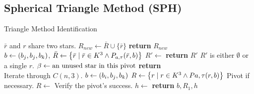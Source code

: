 \documentclass[conference]{IEEEtran}
\begin{document}
    \subsection{Spherical Triangle Method (SPH)}\label{subsec:sphericalTriangleMethod}
    \begin{algorithm}
        \caption{Triangle Method Identification} \label{algorithm:triangleIdentification}
        \begin{algorithmic}[1]
            \LineComment $\bar{r}$ and $r$ share two stars.
            \State $R_{new} \gets \bar{R} \cup \{\bar{r}\}$
            \EndIf
            \EndFor
            \State \textbf{return} $R_{new}$
            \EndFunction
            \\
            \State $b \gets (b_j, b_j, b_k)$, $\bar{R} \gets \left\{  \bar{r} \mid \bar{r} \in K^3
            \land P_{a, \tau}(\bar{r}, b)  \right\}$
            \State $R' \gets $ 
            \State \textbf{return} $R'$ \Comment $R'$ is either $\emptyset$ or a single $r$.
            \Else
            \State $\beta \gets \text{an unused star in this pivot}$
            \State \textbf{return} 
            \EndIf
            \EndFunction
            \\
              \Comment Iterate through $C(n, 3)$.
            \State $b \gets \left(b_i, b_j, b_k\right)$
            \State $R \gets \left\{  r \mid r \in K^3
            \land P{a, \tau}(r, b)  \right\}$
             \Comment Pivot if necessary.
            \State $R \gets $ 
            \EndIf
             \Comment Verify the pivot's success.
            \State $h \gets $ 
            \invalidBijection
            \State \textbf{return} $b, R_1, h$
            \EndIf
            \EndIf
            \EndFor
            \EndFor
            \EndFor
            \EndFunction
        \end{algorithmic}
    \end{algorithm}
\end{document}

